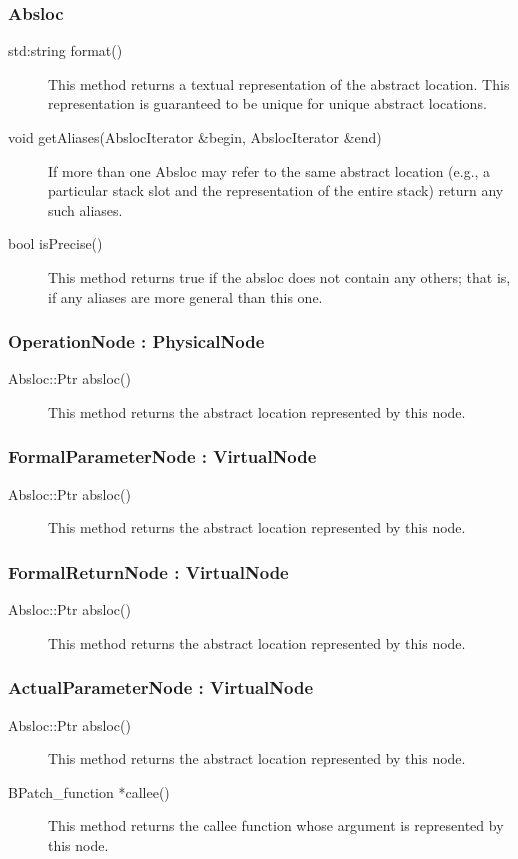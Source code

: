 \documentclass[12pt,titlepage]{article}
\begin{document}
\subsubsection{Absloc}
\begin{description}
\item[std:string format()]
This method returns a textual representation of the abstract location. This representation is guaranteed to be unique for unique abstract locations.
\item[void getAliases(AbslocIterator \&begin, AbslocIterator \&end)]
If more than one Absloc may refer to the same abstract location (e.g., a particular stack slot and the representation of the entire stack) return any such aliases.
\item[bool isPrecise()]
This method returns true if the absloc does not contain any others; that is, if any aliases are more general than this one.
\end{description}

\subsubsection{OperationNode : PhysicalNode}
\begin{description}
\item[Absloc::Ptr absloc()]
This method returns the abstract location represented by this node.
\end{description}

\subsubsection{FormalParameterNode : VirtualNode}
\begin{description}
\item[Absloc::Ptr absloc()]
This method returns the abstract location represented by this node. 
\end{description}

\subsubsection{FormalReturnNode : VirtualNode}
\begin{description}
\item[Absloc::Ptr absloc()]
This method returns the abstract location represented by this node.
\end{description}

\subsubsection{ActualParameterNode : VirtualNode}
\begin{description}
\item[Absloc::Ptr absloc()]
This method returns the abstract location represented by this node.
\item[BPatch\_function *callee() ]
This method returns the callee function whose argument is represented by this node.
\end{description}
\end{document}
